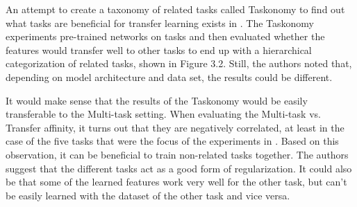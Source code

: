 An attempt to create a taxonomy of related tasks called Taskonomy to find out what tasks are beneficial for transfer learning exists in \citep{taskonomy}.
The Taskonomy experiments pre-trained networks on tasks and then evaluated whether the features would transfer well to other tasks to end up with a hierarchical categorization of related tasks, shown in Figure 3.2.
Still, the authors noted that, depending on model architecture and data set, the results could be different.

It would make sense that the results of the Taskonomy would be easily transferable to the Multi-task setting.
When evaluating the Multi-task vs. Transfer affinity, it turns out that they are negatively correlated, at least in the case of the five tasks that were the focus of the experiments in \citep{whichTasks}.
Based on this observation, it can be beneficial to train non-related tasks together.
The authors suggest that the different tasks act as a good form of regularization.
It could also be that some of the learned features work very well for the other task, but can't be easily learned with the dataset of the other task and vice versa.